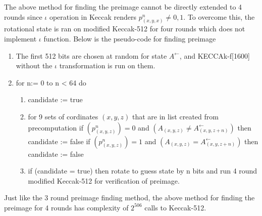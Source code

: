 The above method for finding the preimage cannot be directly extended to 4 rounds since $\iota$ operation in Keccak
renders $p^n_{(x, y, x)} \neq 0, 1$. To overcome this, the rotational state is ran on modified Keccak-512 for four rounds
which does not implement $\iota$ function. Below is the pseudo-code for finding preimage \cite{00022}

\begin{enumerate}
\item The first 512 bits are chosen at random for state $A^{\leftarrow}$, and KECCAk-f[1600] without the $\iota$
transformation is run on them.
\item for n:= 0 to n < 64 do
  \begin{enumerate}
  \item candidate := true
  \item for 9 sets of cordinates $(x, y, z)$ that are in list created from precomputation
  \newline if $(p^n_{(x, y, z)}) = 0$ and $(A_{(x, y, z)} \neq A^{\leftarrow}_{(x, y, z+n)})$ then candidate := false
  \newline if $(p^n_{(x, y, z)}) = 1$ and $(A_{(x, y, z)} = A^{\leftarrow}_{(x, y, z+n)})$ then candidate := false
  \item if (candidate = true) then rotate to guess state by n bits and run 4 round modified Keccak-512 for verification
  of preimage.
  \end{enumerate}
\end{enumerate}

Just like the 3 round preimage finding method, the above method for finding the preimage for 4 rounds has complexity of
$2^{506}$ calls to Keccak-512.


